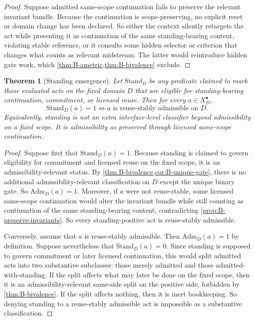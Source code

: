 \documentclass[11pt]{article}
\theoremstyle{plain}
\newtheorem{theorem}{Theorem}[section]
\theoremstyle{definition}
\newcommand{\Adm}{\mathrm{Adm}}
\newcommand{\Stand}{\mathrm{Stand}}
\newcommand{\Eval}{X_D^{\bullet}}
\newcommand{\domain}{D}
\begin{document}
\begin{proof}
Suppose admitted same-scope continuation fails to preserve the relevant invariant bundle. Because the continuation is scope-preserving, no explicit reset or domain change has been declared. So either the context silently retargets the act while presenting it as continuation of the same standing-bearing content, violating stable reference, or it consults some hidden selector or criterion that changes what counts as relevant midstream. The latter would reintroduce hidden gate work, which \cref{thm:B-ametric,thm:B-bivalence} exclude.
\end{proof}

\begin{theorem}[Standing emergence]
\label{thm:B-standing}
Let $\Stand_\domain$ be any predicate claimed to mark those evaluated acts on the fixed domain $\domain$ that are eligible for standing-bearing continuation, commitment, or licensed reuse. Then for every $a\in\Eval$,
\[
\Stand_\domain(a)=1 \Longleftrightarrow a \text{ is reuse-stably admissible on } \domain.
\]
Equivalently, standing is not an extra interface-level classifier beyond admissibility on a fixed scope. It is admissibility as preserved through licensed same-scope continuation.
\end{theorem}

\begin{proof}
Suppose first that $\Stand_\domain(a)=1$. Because standing is claimed to govern eligibility for commitment and licensed reuse on the fixed scope, it is an admissibility-relevant status. By \cref{thm:B-bivalence,cor:B-unique-gate}, there is no additional admissibility-relevant classification on $\domain$ except the unique binary gate. So $\Adm_\domain(a)=1$. Moreover, if $a$ were not reuse-stable, some licensed same-scope continuation would alter the invariant bundle while still counting as continuation of the same standing-bearing content, contradicting \cref{prop:B-preserve-invariants}. So every standing-positive act is reuse-stably admissible.

Conversely, assume that $a$ is reuse-stably admissible. Then $\Adm_\domain(a)=1$ by definition. Suppose nevertheless that $\Stand_\domain(a)=0$. Since standing is supposed to govern commitment or later licensed continuation, this would split admitted acts into two substantive subclasses: those merely admitted and those admitted-with-standing. If the split affects what may later be done on the fixed scope, then it is an admissibility-relevant same-side split on the positive side, forbidden by \cref{thm:B-bivalence}. If the split affects nothing, then it is inert bookkeeping. So denying standing to a reuse-stably admissible act is impossible as a substantive classification.
\end{proof}
\end{document}

